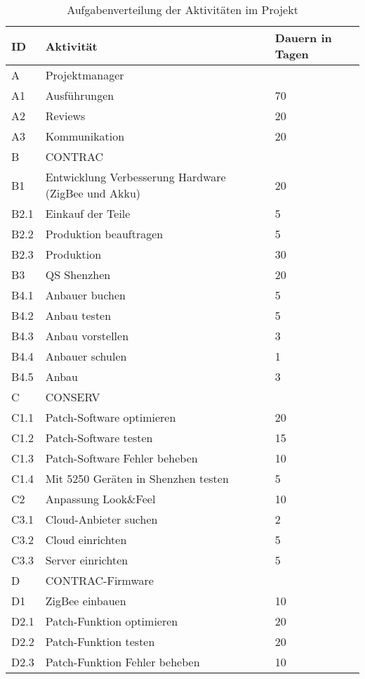 \begin{table}[H]
	\renewcommand{\arraystretch}{1.05}
	\begin{center}
		\begin{tabular}{l|l|l}
			\hline
			\textbf{ID} & \textbf{Aktivität} & \textbf{Dauern in Tagen}\\\hline
			A    & Projektmanager &  \\ \hline
			A1   & Ausführungen & 70 \\  \hline
			A2   & Reviews & 20 \\ \hline
			A3 & Kommunikation & 20 \\\hline
			B    & CONTRAC & \\ \hline
			B1   & Entwicklung Verbesserung Hardware (ZigBee und Akku) & 20\\ \hline
			B2.1 & Einkauf der Teile & 5\\\hline
			B2.2 & Produktion beauftragen & 5\\ \hline
			B2.3 & Produktion & 30\\ \hline
			B3 & QS Shenzhen & 20\\ \hline
			B4.1 & Anbauer buchen & 5\\ \hline
			B4.2 & Anbau testen &5\\ \hline
			B4.3 & Anbau vorstellen &3\\ \hline
			B4.4 & Anbauer schulen &1\\ \hline
			B4.5 & Anbau &3\\ \hline
			C    & CONSERV &\\ \hline
			C1.1 & Patch-Software optimieren & 20\\ \hline
			C1.2 & Patch-Software testen  & 15 \\ \hline
			C1.3 & Patch-Software Fehler beheben  & 10\\ \hline
			C1.4  & Mit 5250 Geräten in Shenzhen testen  & 5\\ \hline
			C2 & Anpassung Look\&Feel  & 10\\\hline
			C3.1 & Cloud-Anbieter suchen  & 2\\ \hline
			C3.2 & Cloud einrichten       & 5\\ \hline
			C3.3 & Server einrichten      & 5\\ \hline
			D    & CONTRAC-Firmware      & \\ \hline
			D1   & ZigBee einbauen       & 10 \\ \hline
			D2.1 & Patch-Funktion optimieren & 20 \\ \hline
			D2.2 & Patch-Funktion testen & 20 \\ \hline
			D2.3 & Patch-Funktion Fehler beheben  & 10 \\
		\end{tabular}
		\caption{Aufgabenverteilung der Aktivitäten im Projekt}
	\end{center}
\end{table}


